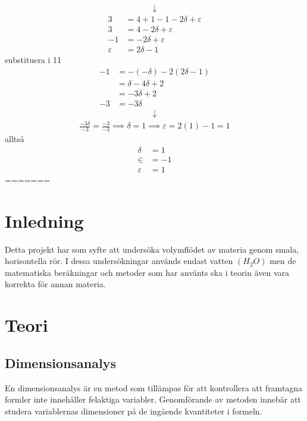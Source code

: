 \documentclass[a4paper,12pt]{article}
\begin{document}
\begin{align}
    \downarrow
\end{align}
\begin{align}
    3 &= 4 + 1 - 1 - 2\delta + \varepsilon \\
    3 &= 4 - 2\delta + \varepsilon \\
    -1 &= -2\delta + \varepsilon \\
    \varepsilon &= 2\delta - 1
\end{align}
substituera i 11
\begin{align}
    -1 &= -(-\delta)-2(2\delta-1) \\
    &= \delta - 4\delta + 2 \\
    &= -3\delta + 2 \\
    -3 &= -3\delta
\end{align}
\begin{align}
    \downarrow
\end{align}
\begin{align}
    \frac{-3\delta}{-3} = \frac{-3}{-3} \implies \delta = 1 \implies \varepsilon = 2(1)-1 = 1
\end{align}
alltså
\begin{align}
    \delta &= 1 \\
    \in &= -1 \\
    \varepsilon &= 1
\end{align}
=======
\section{Inledning}
    Detta projekt har som syfte att undersöka volymflödet av materia genom smala, horisontella rör. I dessa undersökningar används endast vatten $(H_2O)$ men de matematiska beräkningar och metoder som har använts ska i teorin även vara korrekta för annan materia.
%
\section{Teori}
%
\subsection{Dimensionsanalys}
    En dimensionsanalys är en metod som tillämpas för att kontrollera att framtagna formler inte innehåller felaktiga variabler. Genomförande av metoden innebär att studera variablernas dimensioner på de ingående kvantiteter i formeln.
%
\end{document}
